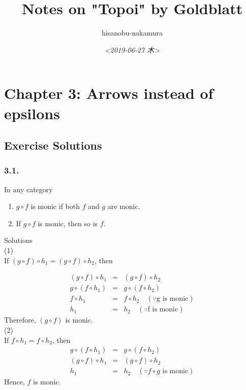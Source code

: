 \documentclass{article}
\author{hisanobu-nakamura}
\date{\textit{<2019-06-27 木>}}
\title{Notes on "Topoi" by Goldblatt}
\begin{document}
\maketitle
\tableofcontents


\section{Chapter 3: Arrows instead of epsilons}
\label{sec-1}

\subsection{Exercise Solutions}
\label{sec-1-1}

\subsubsection{3.1.}
\label{sec-1-1-1}
In any category
\begin{enumerate}
\item $g \circ f$ is monic if both $f$ and $g$ are monic.
\item If $g \circ f$ is monic, then so is $f$.
\end{enumerate}
Solutions \\
(1) \\
If $(g \circ f) \circ h_{1} = (g \circ f) \circ h_{2}$, then 

\begin{eqnarray*}
(g \circ f) \circ h_{1} &=& (g \circ f) \circ h_{2}\\
g \circ (f \circ h_{1}) &=& g \circ (f \circ h_{2})\\
f \circ h_{1} &=& f \circ h_{2}  \quad (\because \text{g is monic})\\
h_{1} &=& h_{2}  \quad (\because \text{f is monic})
\end{eqnarray*}
Therefore, $(g \circ f)$ is monic. \\
(2) \\
If $f \circ h_{1} = f \circ h_{2}$, then 
\begin{eqnarray*}
g \circ (f \circ h_{1}) &=& g \circ (f \circ h_{2})\\
(g \circ f) \circ h_{1} &=& (g \circ f) \circ h_{2}\\
h_{1} &=& h_{2}  \quad (\because \text{$f \circ g$ is monic})
\end{eqnarray*}
Hence, $f$ is monic.
\end{document}
